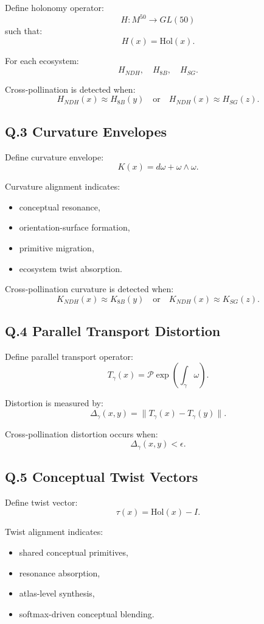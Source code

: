 Define holonomy operator:
\[
H : M^{50} \to GL(50)
\]
such that:
\[
H(x) = \mathrm{Hol}(x).
\]

For each ecosystem:
\[
H_{NDH},\quad H_{8B},\quad H_{SG}.
\]

Cross-pollination is detected when:
\[
H_{NDH}(x) \approx H_{8B}(y)
\quad\text{or}\quad
H_{NDH}(x) \approx H_{SG}(z).
\]

\subsection*{Q.3 Curvature Envelopes}

Define curvature envelope:
\[
K(x) = d\omega + \omega \wedge \omega.
\]

Curvature alignment indicates:
\begin{itemize}
    \item conceptual resonance,
    \item orientation-surface formation,
    \item primitive migration,
    \item ecosystem twist absorption.
\end{itemize}

Cross-pollination curvature is detected when:
\[
K_{NDH}(x) \approx K_{8B}(y)
\quad\text{or}\quad
K_{NDH}(x) \approx K_{SG}(z).
\]

\subsection*{Q.4 Parallel Transport Distortion}

Define parallel transport operator:
\[
T_{\gamma}(x) = \mathcal{P}\exp\left(\int_{\gamma} \omega\right).
\]

Distortion is measured by:
\[
\Delta_{\gamma}(x,y)
=
\|T_{\gamma}(x) - T_{\gamma}(y)\|.
\]

Cross-pollination distortion occurs when:
\[
\Delta_{\gamma}(x,y) < \epsilon.
\]

\subsection*{Q.5 Conceptual Twist Vectors}

Define twist vector:
\[
\tau(x) = \mathrm{Hol}(x) - I.
\]

Twist alignment indicates:
\begin{itemize}
    \item shared conceptual primitives,
    \item resonance absorption,
    \item atlas-level synthesis,
    \item softmax-driven conceptual blending.
\end{itemize}

